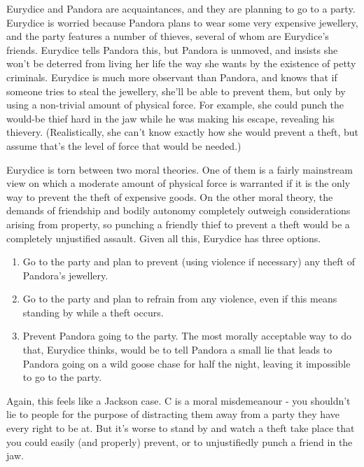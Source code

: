 \documentclass[
  10pt,
  letterpaper,
  twoside]{scrbook}
\providecommand{\tightlist}{%
  \setlength{\itemsep}{0pt}\setlength{\parskip}{0pt}}\usepackage{longtable,booktabs,array}
\begin{document}
{Eurydice} and {Pandora} are acquaintances, and they are planning to go
to a party. {Eurydice} is worried because {Pandora} plans to wear some
very expensive jewellery, and the party features a number of thieves,
several of whom are {Eurydice}'s friends. {Eurydice} tells {Pandora}
this, but {Pandora} is unmoved, and insists she won't be deterred from
living her life the way she wants by the existence of petty criminals.
{Eurydice} is much more observant than {Pandora}, and knows that if
someone tries to steal the jewellery, she'll be able to prevent them,
but only by using a non-trivial amount of physical force. For example,
she could punch the would-be thief hard in the jaw while he was making
his escape, revealing his thievery. (Realistically, she can't know
exactly how she would prevent a theft, but assume that's the level of
force that would be needed.)

{Eurydice} is torn between two moral theories. One of them is a fairly
mainstream view on which a moderate amount of physical force is
warranted if it is the only way to prevent the theft of expensive goods.
On the other moral theory, the demands of friendship and bodily autonomy
completely outweigh considerations arising from property, so punching a
friendly thief to prevent a theft would be a completely unjustified
assault. Given all this, {Eurydice} has three options.

\begin{enumerate}
\def\labelenumi{\arabic{enumi}.}
\tightlist
\item
  Go to the party and plan to prevent (using violence if necessary) any
  theft of {Pandora}'s jewellery.
\item
  Go to the party and plan to refrain from any violence, even if this
  means standing by while a theft occurs.
\item
  Prevent {Pandora} going to the party. The most morally acceptable way
  to do that, {Eurydice} thinks, would be to tell {Pandora} a small lie
  that leads to {Pandora} going on a wild goose chase for half the
  night, leaving it impossible to go to the party.
\end{enumerate}

Again, this feels like a Jackson case. C is a moral misdemeanour - you
shouldn't lie to people for the purpose of distracting them away from a
party they have every right to be at. But it's worse to stand by and
watch a theft take place that you could easily (and properly) prevent,
or to unjustifiedly punch a friend in the jaw.
\end{document}
